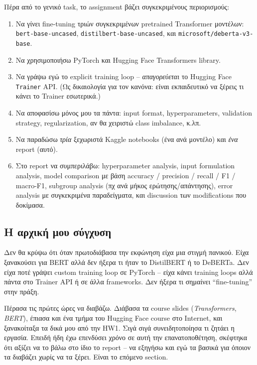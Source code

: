 \documentclass[12pt]{fphw}
\begin{document}
Πέρα από το γενικό task, το assignment βάζει συγκεκριμένους περιορισμούς:

\begin{enumerate}
    \item Να γίνει fine-tuning τριών συγκεκριμένων pretrained Transformer μοντέλων: \texttt{bert-base-uncased}, \texttt{distilbert-base-uncased}, και \texttt{microsoft/deberta-v3-base}.
    \item Να χρησιμοποιήσω PyTorch και Hugging Face Transformers library.
    \item Να γράψω εγώ το explicit training loop -- \emph{απαγορεύεται} το Hugging Face \texttt{Trainer} API. (Ως δικαιολογία για τον κανόνα: είναι εκπαιδευτικό να ξέρεις τι κάνει το Trainer εσωτερικά.)
    \item Να αποφασίσω μόνος μου τα πάντα: input format, hyperparameters, validation strategy, regularization, αν θα χειριστώ class imbalance, κ.λπ.
    \item Να παραδώσω \emph{τρία} ξεχωριστά Kaggle notebooks (ένα ανά μοντέλο) και \emph{ένα} report (αυτό).
    \item Στο report να συμπεριλάβω: hyperparameter analysis, input formulation analysis, model comparison με βάση accuracy / precision / recall / F1 / macro-F1, subgroup analysis (πχ ανά μήκος ερώτησης/απάντησης), error analysis με συγκεκριμένα παραδείγματα, και discussion των modifications που δοκίμασα.
\end{enumerate}

\subsection{Η αρχική μου σύγχυση}

Δεν θα κρύψω ότι όταν πρωτοδιάβασα την εκφώνηση είχα μια στιγμή πανικού. Είχα ξανακούσει για BERT αλλά δεν ήξερα τι ήταν το DistilBERT ή το DeBERTa. Δεν είχα ποτέ γράψει custom training loop σε PyTorch -- είχα κάνει training loops αλλά πάντα στο Trainer API ή σε άλλα frameworks. Δεν ήξερα τι σημαίνει ``fine-tuning'' στην πράξη.

Πέρασα τις πρώτες ώρες να διαβάζω. Διάβασα τα course slides (\emph{Transformers}, \emph{BERT}), έπιασα και ένα τμήμα του Hugging Face course στο Internet, και ξανακοίταξα τα δικά μου από την HW1. Σιγά σιγά συνειδητοποίησα τι ζητάει η εργασία. Επειδή ήδη έχω επενδύσει χρόνο σε αυτή την επανατοποθέτηση, σκέφτηκα ότι αξίζει να το βάλω στο ίδιο το report -- να εξηγήσω και εγώ τα βασικά για όποιον τα διαβάζει χωρίς να τα ξέρει. Είναι το επόμενο section.
\end{document}
